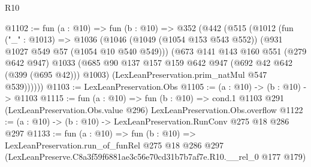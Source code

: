 \begin{lexlean}{R10}
\begin{coremodule}
@1102 := fun (a : @10) =>
  fun (b : @10) =>
  @352
    (@442
      (@515
        (@1012
          (fun ("_" : @1013) =>
          @1036
            (@1046 (@1049 (@1054 @153 @543 @552)) (@931 @1027 @549 @57 (@1054 @10 @540 @549)))
            (@673
              @141
              @143
              @160
              @551
              (@279 @642 @947)
              @1033
              (@685 @90 @137 @157 @159 @642 @947 (@692 @42 @642 (@399 (@695 @42))) @1003)
              (LexLeanPreservation.prim_natMul @547 @539))))))
@1103 := LexLeanPreservation.Obs
@1105 := (a : @10) -> (b : @10) -> @1103
@1115 := fun (a : @10) =>
  fun (b : @10) =>
  cond.{1} @1103 @291 (LexLeanPreservation.Obs.value @296) LexLeanPreservation.Obs.overflow
@1122 := (a : @10) -> (b : @10) -> LexLeanPreservation.RunConv @275 @18 @286 @297
@1133 := fun (a : @10) =>
  fun (b : @10) =>
  LexLeanPreservation.run_of_funRel
    @275
    @18
    @286
    @297
    (LexLeanPreserve.C8a3f59f6881ae3c56e70cd31b7b7af7e.R10.__rel_0 @177 @179)
\end{coremodule}
\end{lexlean}
